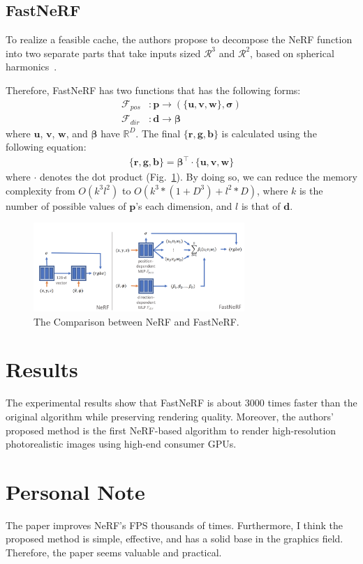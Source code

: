 \documentclass[10pt,twocolumn,letterpaper]{article}
\begin{document}
\subsection{FastNeRF}
To realize a feasible cache, the authors propose to decompose the NeRF function into two separate parts that take inputs sized $\mathcal{R}^3$ and $\mathcal{R}^2$, based on spherical harmonics~\cite{SH1, SH2}.

Therefore, FastNeRF has two functions that has the following forms:
\begin{align*}
	\mathcal{F}_{pos}&: \mathbf{p} \rightarrow (\{\mathbf{u}, \mathbf{v}, \mathbf{w}\}, \mathbf{\sigma})\\
	\mathcal{F}_{dir}&: \mathbf{d} \rightarrow \mathbf{\beta}
\end{align*}
where $\mathbf{u}$, $\mathbf{v}$, $\mathbf{w}$, and $\mathbf{\beta}$ have $\mathbb{R}^D$.
The final $\{\mathbf{r}, \mathbf{g}, \mathbf{b}\}$ is calculated using the following equation:
\begin{align*}
	\{\mathbf{r}, \mathbf{g}, \mathbf{b}\} = \mathbf{\beta}^{\intercal} \cdot \{\mathbf{u}, \mathbf{v}, \mathbf{w}\}
\end{align*}
where $\cdot$ denotes the dot product (Fig.~\ref{fig:imgs}).
By doing so, we can reduce the memory complexity from $O(k^3l^2)$ to $O(k^3 * (1 + D^3) + l^2 * D)$, where $k$ is the number of possible values of $\mathbf{p}$'s each dimension, and $l$ is that of $\mathbf{d}$.

\begin{figure}[t]
	\centering
	\includegraphics[width=8cm]{assets/FastNeRF.png}
	\caption{The Comparison between NeRF and FastNeRF.}
	\label{fig:imgs}
\end{figure}

\section{Results}
The experimental results show that FastNeRF is about 3000 times faster than the original algorithm while preserving rendering quality. Moreover, the authors' proposed method is the first NeRF-based algorithm to render high-resolution photorealistic images using high-end consumer GPUs.

\section{Personal Note}
The paper improves NeRF's FPS thousands of times. Furthermore, I think the proposed method is simple, effective, and has a solid base in the graphics field. Therefore, the paper seems valuable and practical.

{\small


}
\end{document}
